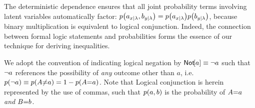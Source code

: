 The deterministic dependence ensures that all joint probability terms involving latent variables automatically factor: $\p{a_{x|\lambda} , b_{y|\lambda}}=\p{a_{x|\lambda}}\p{b_{y|\lambda}}$, because binary multiplication is equivalent to logical conjunction. Indeed, the connection between formal logic statements and probabilities forms the essence of our technique for deriving inequalities.



We adopt the convention of indicating logical negation by $\operatorname{\mathsf{Not}}\!\bracks*{a}\equiv\na$ such that $\lnot a$ references the possibility of \emph{any} outcome other than $a$, i.e. $\p{\na}\equiv\p{A\cramp{\neq}a}=1-\p{A\cramp{=}a}$. Note that Logical conjunction is herein represented by the use of commas, such that $\p{a,b}$ is the probability of $A\mathord{=}a$ \emph{and} $B\mathord{=}b$.



